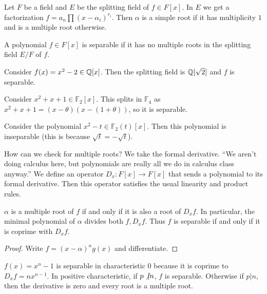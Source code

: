 \documentclass[10pt, twoside]{article}
\newcommand{\F}{\mathbb{F}}
\begin{document}
    Let $F$ be a field and $E$ be the splitting field of $f \in F[x]$. In $E$ we get a factorization $f = a_n \prod (x-\alpha_i)^{r_i}$. Then $\alpha$ is a simple root if it has multiplicity $1$ and is a multiple root otherwise. 

    \begin{defn}
        A polynomial $f \in F[x]$ is separable if it has no multiple roots in the splitting field $E/F$ of $f$.
    \end{defn}

    \begin{exm}
        Consider $f(x)= x^2-2 \in \mathbb{Q}[x]$. Then the splitting field is $\mathbb{Q}[\sqrt{2}]$ and $f$ is separable. 
        
        Consider $x^2+x+1 \in \F_2[x]$. This splits in $\F_4$ as $x^2+x+1 = (x - \theta)(x-(1+\theta))$, so it is separable. 
    \end{exm}

    \begin{exm}
        Consider the polynomial $x^2-t \in \F_2(t)[x]$. Then this polynomial is inseparable (this is because $\sqrt{t} = -\sqrt{t}$).
    \end{exm}

    How can we check for multiple roots? We take the formal derivative. ``We aren't doing calculus here, but polynomials are really all we do in calculus class anyway.'' We define an operator $D_x: F[x] \rightarrow F[x]$ that sends a polynomial to its formal derivative. Then this operator satisfies the usual linearity and product rules.

    \begin{prop}
        $\alpha$ is a multiple root of $f$ if and only if it is also a root of $D_x f$. In particular, the minimal polynomial of $\alpha$ divides both $f,D_x f$. Thus $f$ is separable if and only if it is coprime with $D_xf$.
        \begin{proof}
            Write $f = (x - \alpha)^ng(x)$ and differentiate.
        \end{proof}
    \end{prop}

    \begin{exm}
        $f(x) = x^n - 1$ is separable in characteristic $0$ because it is coprime to $D_xf = nx^{n-1}$. In positive characteristic, if $p \not\vert n$, $f$ is separable. Otherwise if $p | n$, then the derivative is zero and every root is a multiple root.
    \end{exm}
\end{document}
